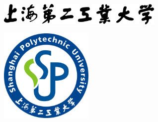 \pagestyle{empty}

\linespread{0.8}

\begin{figure}[htbp!]
  \centering
  \includegraphics[width=8cm]{../assets/sspu_title_black.eps}
\end{figure}

\vspace{1em}

\begin{center}
  \sffamily\bfseries
  \primaryTitle
\end{center}

\vspace{0.5em}

\begin{figure}[htbp!]
  \centering
  \includegraphics[height=4.5cm,width=4.5cm]{../assets/sspu_logo.eps}
\end{figure}

\vspace{1em}

